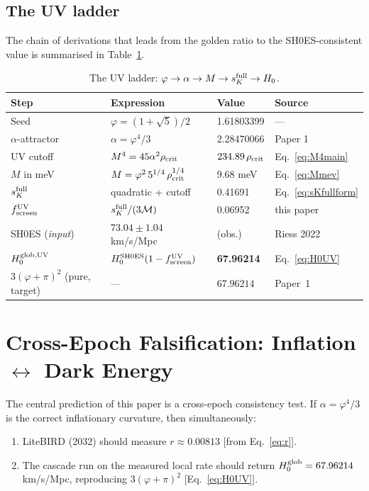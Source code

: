 \documentclass[12pt,a4paper]{article}
\newcommand{\phiG}{\varphi}
\newcommand{\MIRA}{\mathcal{M}}
\newcommand{\fsc}{f_{\mathrm{screen}}}
\newcommand{\sK}{s_K}
\newcommand{\rhoc}{\rho_{\rm crit}}
\begin{document}
\subsection{The UV ladder}

The chain of derivations that leads from the golden ratio to the SH0ES-consistent
value is summarised in Table~\ref{tab:ladder}.

\begin{table}[ht]
\centering
\caption{The UV ladder: $\phiG \to \alpha \to M \to \sK^{\rm full} \to H_0$.}
\label{tab:ladder}
\begin{tabular}{llll}
\toprule
Step & Expression & Value & Source \\
\midrule
Seed & $\phiG = (1+\sqrt{5})/2$ & 1.61803399 & --- \\
$\alpha$-attractor & $\alpha = \phiG^4/3$ & 2.28470066 & Paper 1 \\
UV cutoff & $M^4 = 45\alpha^2\rhoc$ & $234.89\,\rhoc$ & Eq.~\eqref{eq:M4main} \\
$M$ in meV & $M = \phiG^2\,5^{1/4}\,\rhoc^{1/4}$ & 9.68 meV & Eq.~\eqref{eq:Mmev} \\
$\sK^{\rm full}$ & quadratic + cutoff & 0.41691 & Eq.~\eqref{eq:sKfullform} \\
$\fsc^{\rm UV}$ & $\sK^{\rm full}/(3\MIRA)$ & 0.06952 & this paper \\
SH0ES (\emph{input}) & $73.04 \pm 1.04$ km/s/Mpc & (obs.) & Riess 2022 \\
$H_0^{\rm glob,UV}$ & $H_0^{\rm SH0ES}(1-\fsc^{\rm UV})$ & \textbf{67.96214} & Eq.~\eqref{eq:H0UV} \\
$3(\phiG+\pi)^2$ (pure, target) & --- & $67.96214$ & Paper~1 \\
\bottomrule
\end{tabular}
\end{table}


\section{Cross-Epoch Falsification: Inflation $\leftrightarrow$ Dark Energy}
\label{sec:cross}

The central prediction of this paper is a cross-epoch consistency test.
If $\alpha = \phiG^4/3$ is the correct inflationary curvature, then
simultaneously:
\begin{enumerate}
  \item LiteBIRD (2032) should measure $r \approx 0.00813$
        [from Eq.~\eqref{eq:r}].
  \item The cascade run on the measured local rate should return
        $H_0^{\rm glob} = 67.96214$ km/s/Mpc, reproducing $3(\phiG+\pi)^2$
        [Eq.~\eqref{eq:H0UV}].
\end{enumerate}
\end{document}

